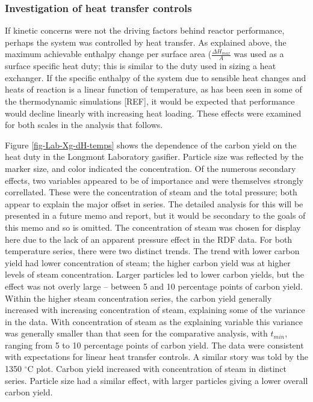 \documentclass[11pt,twocolumn]{article}
\begin{document}


\subsubsection*{Investigation of heat transfer controls}

If kinetic concerns were not the driving factors behind reactor performance, perhaps the system was controlled by heat transfer.  As explained above, the maximum achievable enthalpy change per surface area ($\frac{\Delta H_{max}}{A}$ was used as a surface specific heat duty; this is similar to the duty used in sizing a heat exchanger.  If the specific enthalpy of the system due to sensible heat changes and heats of reaction is a linear function of temperature, as has been seen in some of the thermodynamic simulations [REF], it would be expected that performance would decline linearly with increasing heat loading.  These effects were examined for both scales in the analysis that follows.

Figure \ref{fig-Lab-Xg-dH-temps} shows the dependence of the carbon yield on the heat duty in the Longmont Laboratory gasifier.  Particle size was reflected by the marker size, and color indicated the concentration.  Of the numerous secondary effects, two variables appeared to be of importance and were themselves strongly correllated.  These were the concentration of steam and the total pressure; both appear to explain the major offset in series.  The detailed analysis for this will be presented in a future memo and report, but it would be secondary to the goals of this memo and so is omitted.  The concentration of steam was chosen for display here due to the lack of an apparent pressure effect in the RDF data.  For both temperature series, there were two distinct trends.  The trend with lower carbon yield had lower concentration of steam; the higher carbon yield was at higher levels of steam concentration.  Larger particles led to lower carbon yields, but the effect was not overly large -- between 5 and 10 percentage points of carbon yield.  Within the higher steam concentration series, the carbon yield generally increased with increasing concentration of steam, explaining some of the variance in the data.  With concentration of steam as the explaining variable this variance was generally smaller than that seen for the comparative analysis, with $t_{min}$, ranging from 5 to 10 percentage points of carbon yield.  The data were consistent with expectations for linear heat transfer controls.  A similar story was told by the 1350 $^{\circ}$C plot.  Carbon yield increased with concentration of steam in distinct series.  Particle size had a similar effect, with larger particles giving a lower overall carbon yield.
\end{document}
